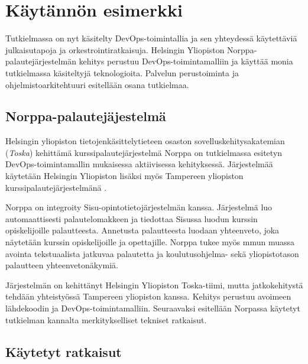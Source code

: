 \chapter{Käytännön esimerkki\label{example}}

Tutkielmassa on nyt käsitelty DevOps-toimintallia ja sen yhteydessä käytettäviä julkaisutapoja ja orkestrointiratkaisuja.
Helsingin Yliopiston Norppa-palautejärjestelmän kehitys perustuu DevOps-toimintamalliin ja käyttää monia tutkielmassa käsiteltyjä teknologioita.
Palvelun perustoiminta ja ohjelmistoarkitehtuuri esitellään osana tutkielmaa.


\section{Norppa-palautejäjestelmä}

Helsingin yliopiston tietojenkäsittelytieteen osaston sovelluskehitysakatemian (\textit{Toska}) \cite{Tenhunen23} kehittämä kurssipalautejärjestelmä Norppa on tutkielmassa esitetyn DevOps-toimintamallin mukaisessa aktiivisessa kehityksessä.
Järjestelmää käytetään Helsingin Yliopiston lisäksi myös Tampereen yliopiston kurssipalautejärjestelmänä \cite{Tampere23}.

Norppa on integroity Sisu-opintotietojärjestelmän kanssa. Järjestelmä luo automaattisesti palautelomakkeen ja tiedottaa Sisussa luodun kurssin opiskelijoille palautteesta.
Annetusta palautteesta luodaan yhteenveto, joka näytetään kurssin opiskelijoille ja opettajille.
Norppa tukee myös mmun muassa avointa tekstuaalista jatkuvaa palautetta ja koulutusohjelma- sekä yliopistotason palautteen yhteenvetonäkymiä.

Järjestelmän on kehittänyt Helsingin Yliopiston Toska-tiimi, mutta jatkokehitystä tehdään yhteistyössä Tampereen yliopiston kanssa.
Kehitys perustuu avoimeen lähdekoodin ja DevOps-toimintamalliin.
Seuraavaksi esitellään Norpassa käytetyt tutkielman kannalta merkitykselliset tekniset ratkaisut.

\section{Käytetyt ratkaisut}



